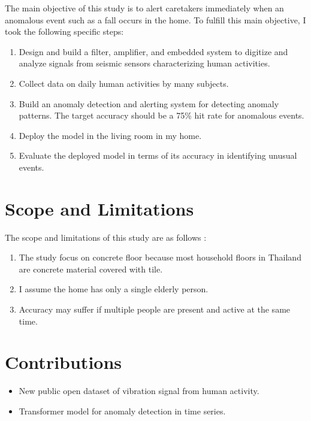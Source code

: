 The main objective of this study is to alert caretakers immediately when an anomalous event such as a fall occurs in the home. To fulfill this main objective, I took the following specific steps:
\begin{enumerate}
    \item Design and build a filter, amplifier, and embedded system to digitize and analyze signals from seismic sensors characterizing human activities.
    \item Collect data on daily human activities by many subjects.
    \item Build an anomaly detection and alerting system for detecting anomaly patterns. The target accuracy should be a 75\% hit rate for anomalous events.
    \item Deploy the model in the living room in my home.
    \item Evaluate the deployed model in terms of its accuracy in identifying unusual events.
\end{enumerate}

\section{Scope and Limitations}

The scope and limitations of this study are as follows :
\begin{enumerate}
    \item The study focus on concrete floor because most household floors in Thailand are concrete material covered with tile.
    \item I assume the home has only a single elderly person.
    \item Accuracy may suffer if multiple people are present and active at the same time.
\end{enumerate}

\section{Contributions}


\begin{itemize}
    \item New public open dataset of vibration signal from human activity.
    \item Transformer model for anomaly detection in time series.
\end{itemize}


